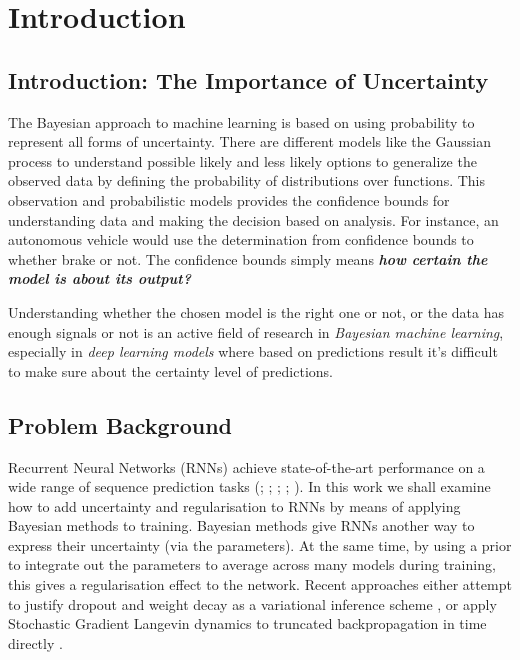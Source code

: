 \chapter{Introduction}
\label{chap:intro}

\section{Introduction: The Importance of Uncertainty}

The Bayesian approach to machine learning is based on using probability to represent all forms of uncertainty. There are different models like the Gaussian process to understand possible likely and less likely options to generalize the observed data by defining the probability of distributions over functions. This observation and probabilistic models provides the confidence bounds for understanding data and making the decision based on analysis. For instance, an autonomous vehicle would use the determination from confidence bounds to whether brake or not. The confidence bounds simply means \textbf{\textit{how certain the model is about its output?}}

Understanding whether the chosen model is the right one or not, or the data has enough signals or not is an active field of research \cite{Ghahramani2015} in \textit{Bayesian machine learning}, especially in \textit{deep learning models} where based on predictions result it's difficult to make sure about the certainty level of predictions.  


\section{Problem Background}

Recurrent Neural Networks (RNNs) achieve state-of-the-art performance on a wide range of sequence prediction tasks (\cite{Wu2016}; \cite{Amodei2015}; \cite{Jozefowicz2016}; \cite{Zaremba2014}; \cite{Lu2016}).
In this work we shall examine how to add uncertainty and regularisation to RNNs by means of applying Bayesian methods to training.
Bayesian methods give RNNs another way to express their uncertainty (via the parameters).
At the same time, by using a prior to integrate out the parameters to average across many models during training, this gives a regularisation effect to the network.
Recent approaches either attempt to justify dropout \cite{Srivastava2014} and weight decay as a variational inference scheme \cite{Gal2015}, or apply Stochastic Gradient Langevin dynamics \cite{Welling2011} to truncated backpropagation in time directly \cite{Gan2016}.

